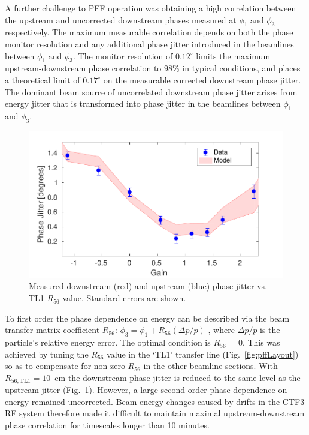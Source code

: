 \documentclass[%
 reprint,
 superscriptaddress,
 amsmath,
 amssymb,
 prl,
]{revtex4-1}
\begin{document}
A further challenge to PFF operation was obtaining a high correlation 
between the upstream and uncorrected downstream phases measured at \(\phi_1\) 
and \(\phi_3\) respectively. 
The maximum measurable correlation depends on both the phase monitor resolution 
and any additional phase jitter introduced in the beamlines between \(\phi_1\) 
and \(\phi_3\). The monitor resolution of \(0.12^\circ\) limits the maximum 
upstream-downstream phase correlation to \(98\%\) in typical conditions, and 
places a theoretical limit of \(0.17^\circ\) on the measurable corrected 
downstream phase jitter. 
The dominant beam source of uncorrelated downstream phase jitter 
arises from energy jitter that is transformed into phase jitter in the 
beamlines between \(\phi_1\) and \(\phi_3\). 

\begin{figure}
	\includegraphics[width=\columnwidth]{toSubmit/fig4}
	\caption{\label{fig:r56Scan}Measured downstream (red) and upstream (blue) 
	phase jitter vs. TL1 \(R_{56}\) value. Standard errors are shown.
		}
\end{figure}

To first order the phase dependence on energy can be described via the beam 
transfer matrix coefficient 
\(R_{56}\): \(\phi_3 = \phi_1 + R_{56}(\Delta p / p)\)
, where \(\Delta p / p\) is the particle's relative energy error.
The optimal condition is \(R_{56}\) = 0.
This was achieved by tuning the \(R_{56}\) value in the `TL1' transfer line 
(Fig.~\ref{fig:pffLayout}) so as to compensate for non-zero \(R_{56}\) in the 
other beamline sections. With \(R_{56, \mathrm{TL1}}=10\)~cm the 
downstream phase jitter is reduced to the same level as the upstream jitter 
(Fig.~\ref{fig:r56Scan}). 
However, a large second-order phase dependence on energy remained uncorrected.
Beam energy changes caused by drifts in the CTF3 RF system therefore made it 
difficult to maintain maximal upstream-downstream phase correlation for 
timescales longer than 10 minutes.
\end{document}
